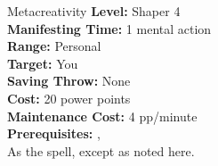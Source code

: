 {Metacreativity}
{
	\textbf{Level:}
	Shaper 4\\
	\textbf{Manifesting Time:}
	1 mental action\\
	\textbf{Range:}
	Personal\\
	\textbf{Target:}
	You\\
	\textbf{Saving Throw:}
	None\\
	\textbf{Cost:}
	20 power points\\
	\textbf{Maintenance Cost:}
	4 pp/minute\\
	\textbf{Prerequisites:}
	, \\
}
{
	As the  spell, except as noted here.
}